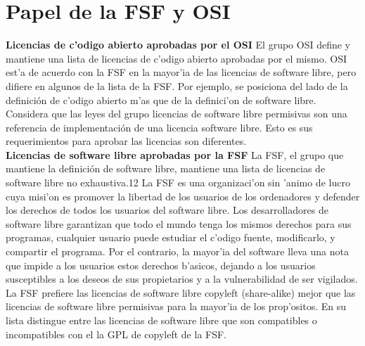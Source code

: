 \section{Papel de la FSF y OSI}

{\bf Licencias de c'odigo abierto aprobadas por el OSI}
El grupo OSI define y mantiene una lista de licencias de c'odigo abierto aprobadas por el mismo. OSI est'a de acuerdo con la FSF en la mayor'ia de las licencias de software libre, pero difiere en algunos de la lista de la FSF. Por ejemplo, se posiciona del lado de la definición de c'odigo abierto m'as que de la definici'on de software libre. Considera que las leyes del grupo licencias de software libre permisivas son una referencia de implementación de una licencia software libre. Esto es sus requerimientos para aprobar las licencias son diferentes.
\\
{\bf Licencias de software libre aprobadas por la FSF}
La FSF, el grupo que mantiene la definición de software libre, mantiene una lista de licencias de software libre no exhaustiva.12 La FSF es una organizaci'on sin 'animo de lucro cuya misi'on es promover la libertad de los usuarios de los ordenadores y defender los derechos de todos los usuarios del software libre. Los desarrolladores de software libre garantizan que todo el mundo tenga los mismos derechos para sus programas, cualquier usuario puede estudiar el c'odigo fuente, modificarlo, y compartir el programa. Por el contrario, la mayor'ia del software lleva una nota que impide a los usuarios estos derechos b'asicos, dejando a los usuarios susceptibles a los deseos de sus propietarios y a la vulnerabilidad de ser vigilados. La FSF prefiere las licencias de software libre copyleft (share-alike) mejor que las licencias de software libre permisivas para la mayor'ia de los prop'ositos. En su lista distingue entre las licencias de software libre que son compatibles o incompatibles con el la GPL de copyleft de la FSF.
\\

